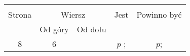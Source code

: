 \documentclass[a4paper,11pt]{article}
\begin{document}
\vspace{\spaceTwo}









\begin{center}
  \begin{tabular}{|c|c|c|c|c|}
    \hline
    & \multicolumn{2}{c|}{} & & \\
    Strona & \multicolumn{2}{c|}{Wiersz} & Jest
                              & Powinno być \\ \cline{2-3}
    & Od góry & Od dołu & & \\
    \hline
    8   & 6 & & $p$ ; & $p$; \\
    \hline
  \end{tabular}
\end{center}





 {}



\end{document}
